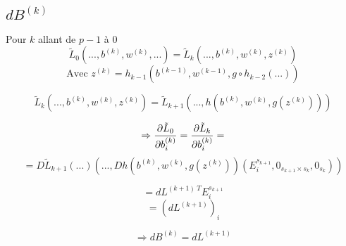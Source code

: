 \subsection{$dB^{(k)}$}
	Pour $k$ allant de $p-1$ à $0$
	\[\tilde{L}_0\left(...,b^{(k)}, w^{(k)}, ...\right) = \tilde{L}_{k}\left(...,b^{(k)}, w^{(k)}, z^{(k)}\right)\]
	\[\text{Avec } z^{(k)} = h_{k-1}\left(b^{(k-1)}, w^{(k-1)}, g\circ h_{k-2}\left(...\right)\right)\]
	\[\]
	
	\[\tilde{L}_{k}(..., b^{(k)}, w^{(k)}, z^{(k)}) = \tilde{L}_{k+1}\left(..., h\left(b^{(k)}, w^{(k)}, g\left(z^{(k)}\right)\right)\right)\]
		
	\[\Rightarrow \pdv{\tilde{L}_0}{b_i^{(k)}}(...) = 
	              \pdv{\tilde{L}_k}{b_i^{(k)}}(...) = \]
	\[= D\tilde{L}_{k+1}\left(
							...%
				\right)\left(
										 ..., Dh\left(
																	b^{(k)}, w^{(k)}, g\left(z^{(k)}\right)
														\right)
														\left(
																	E_i^{s_{k+1}}, 0_{s_{k+1}\times s_k}, 0_{s_k}
														\right)
							 \right)\]
							
	\[= dL^{(k+1)~T} E_i^{s_{k + 1}}\]
	\[= \left(dL^{(k+1)}\right)_i\]
	
	\[\Rightarrow \boxed{dB^{(k)} = dL^{(k+1)}}\]
